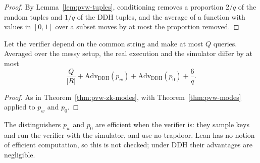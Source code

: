 \begin{proof}
  \leanok
  By Lemma~\ref{lem:pvw-tuples}, conditioning removes a proportion $2/q$ of the random tuples and
  $1/q$ of the DDH tuples, and the average of a function with values in $[0, 1]$ over a subset
  moves by at most the proportion removed.
\end{proof}

\begin{theorem}
  \label{thm:pvw-zk-ddh}
  \leanok
  Let the verifier depend on the common string and make at most $Q$ queries. Averaged over the
  messy setup, the real execution and the simulator differ by at most
  \[ \frac{Q}{|R|} + \mathrm{Adv}_{\mathrm{DDH}}(p_w) + \mathrm{Adv}_{\mathrm{DDH}}(p_0) +
     \frac{6}{q} . \]
\end{theorem}

\begin{proof}
  \leanok
  As in Theorem~\ref{thm:pvw-zk-modes}, with Theorem~\ref{thm:pvw-modes} applied to $p_w$ and
  $p_0$.
\end{proof}

\begin{remark}
  The distinguishers $p_w$ and $p_0$ are efficient when the verifier is: they sample keys and run
  the verifier with the simulator, and use no trapdoor. Lean has no notion of efficient
  computation, so this is not checked; under DDH their advantages are negligible.
\end{remark}
